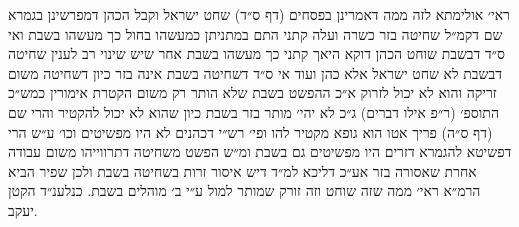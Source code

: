 \documentclass[12pt, openany]{book}
\begin{document}
\begin{multicols}{2}
ראי׳ אולימתא לזה ממה דאמרינן בפסחים (דף ס״ד) שחט ישראל וקבל הכהן דמפרשינן בגמרא שם דקמ״ל שחיטה בזר כשרה ועלה קתני התם במתניתן כמעשהו בחול כך מעשהו בשבת ואי ס״ד דבשבת שוחט הכהן דוקא היאך קתני כך מעשהו בשבת אחר שיש שינוי רב לענין שחיטה דבשבת לא שחט ישראל אלא כהן ועוד אי ס״ד דשחיטה בשבת אינה בזר כיון דשחיטה משום זריקה והוא לא יכול לזרוק א״כ ההפשט בשבת שלא הותר רק משום הקטרת אימורין כמש״כ התוספ׳ (ר״פ אילו דברים) ג״כ לא יהי׳ מותר בזר בשבת כיון שהוא לא יכול להקטיר והרי שם (דף ס״ה) פריך אטו הוא גופא מקטיר להו ופי׳ רש״י דכהנים לא היו מפשיטים וכו׳ ע״ש הרי דפשיטא להגמרא דזרים היו מפשיטים גם בשבת ומ״ש הפשט משחיטה דתרווייהו משום עבודה אחרת שאסורה בזר אע״כ דליכא למ״ד דיש איסור זרות בשחיטה בשבת ולכן שפיר הביא הרמ״א ראי׳ ממה שזה שוחט וזה זורק שמותר למול ע״י ב׳ מוהלים בשבת. כנלענ״ד הקטן יעקב.\\\vspace{0pt}

\end{multicols}\newpage
\end{document}
